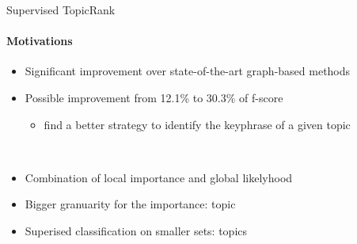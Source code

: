   \begin{frame}{Supervised TopicRank}
    \framesubtitle{Motivations}

    \begin{itemize}
      \item<+->{Significant improvement over state-of-the-art graph-based methods}
      \item<+->{Possible improvement from 12.1\% to 30.3\% of f-score}
      \begin{itemize}
        \item{find a better strategy to identify the keyphrase of a given topic}
      \end{itemize}
    \end{itemize}~\\

    \begin{itemize}
      \item<+->{Combination of local importance and global likelyhood}
      \item<+->{Bigger granuarity for the importance: topic}
      \item<+->{Superised classification on smaller sets: topics}
    \end{itemize}
  \end{frame}

